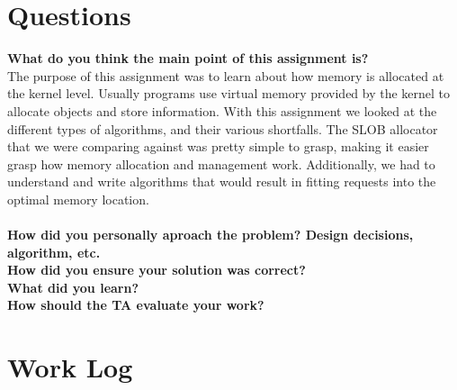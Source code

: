 \documentclass[10pt,onecolumn,draftclsnofoot]{IEEEtran} %
\begin{document}
\begin{singlespace}
\section{\bf Questions}
        \textbf{What do you think the main point of this assignment is?}\\
                \normalfont \indent The purpose of this assignment was to learn about how memory is allocated at the kernel level. Usually programs use virtual memory provided by the kernel to allocate objects and store information.  With this assignment we looked at the different types of algorithms, and their various shortfalls.  The SLOB allocator that we were comparing against was pretty simple to grasp, making it easier grasp how memory allocation and management work. Additionally, we had to understand and write algorithms that would result in fitting requests into the optimal memory location. \\\\
       \textbf{How did you personally aproach the problem? Design decisions, algorithm, etc.}\\
	  		\normalfont \indent 
	  \textbf{How did you ensure your solution was correct?}\\
                \normalfont \indent   
               \textbf{What did you learn?}\\
        		\normalfont \indent
        \textbf{How should the TA evaluate your work?}\\
	\section{\bf Work Log}

                

\newpage


\end{singlespace}
\restoregeometry
\end{document}
